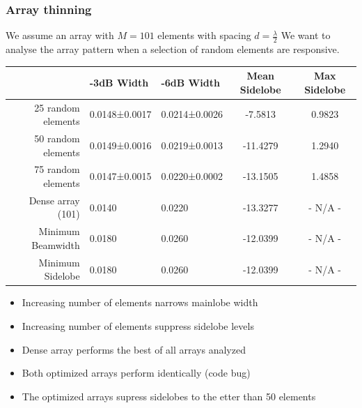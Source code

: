 \documentclass[compress]{beamer}
\begin{document}
\begin{frame} %
    \frametitle{Array thinning}
    We assume an array with $M=101$ elements with spacing $d=\frac{\lambda}{2}$
    We want to analyse the array pattern when a selection of random elements are
    responsive.
    \begin{table}[]
        \tabulartext
        \begin{tabular}{r|l|l|c|c}
                   & -3dB Width    & -6dB Width    & Mean Sidelobe & Max Sidelobe \\ \hline
            25 random elements & 0.0148±0.0017 & 0.0214±0.0026 & -7.5813       & 0.9823       \\ \hline
            50 random elements & 0.0149±0.0016 & 0.0219±0.0013 & -11.4279      & 1.2940       \\ \hline
            75 random elements & 0.0147±0.0015 & 0.0220±0.0002 & -13.1505      & 1.4858       \\ \hline
            Dense array (101)  & 0.0140        & 0.0220        & -13.3277      & - N/A -      \\ \hline
            Minimum Beamwidth  & 0.0180        & 0.0260        & -12.0399      & - N/A -      \\ \hline
            Minimum Sidelobe   & 0.0180        & 0.0260        & -12.0399      & - N/A -     
        \end{tabular}
    \end{table}
    \begin{itemize}
        \item Increasing number of elements narrows mainlobe width
        \item Increasing number of elements suppress sidelobe levels
        \item Dense array performs the best of all arrays analyzed
        \item Both optimized arrays perform identically (code bug)
        \item The optimized arrays supress sidelobes to the etter than 50 elements
    \end{itemize}
\end{frame} 
\end{document}
